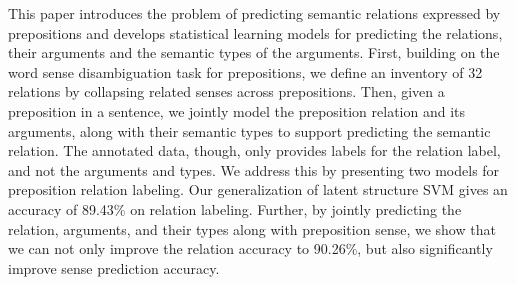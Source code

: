 This paper introduces the problem of predicting semantic relations expressed by prepositions and develops statistical learning models for predicting the
 relations, their arguments and the semantic types of the arguments. First,
 building on the word sense disambiguation task for prepositions, we define an
 inventory of 32 relations by collapsing related senses across prepositions.
 Then, given a preposition in a sentence, we jointly model the preposition
 relation and its arguments, along with their semantic types to support
 predicting the semantic relation. The annotated data, though, only provides
 labels for the relation label, and not the arguments and types. We address this
 by presenting two models for preposition relation labeling. Our generalization
 of latent structure SVM gives an accuracy of 89.43\% on relation labeling.
 Further, by jointly predicting the relation, arguments, and their types along
 with preposition sense, we show that we can not only improve the relation
 accuracy to 90.26\%, but also significantly improve sense prediction accuracy.

